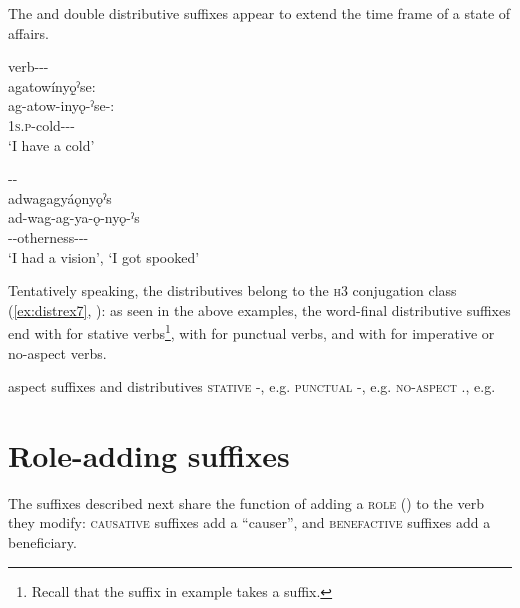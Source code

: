 The  and  double distributive suffixes appear to extend the time frame of a state of affairs.

\ea\label{ex:innerpl2}  verb-{\distributive}-{\distributive}-{\stative}\\
agatowínyǫ̱ˀse:\\
\gll ag-atow-inyǫ-ˀse-:\\
 \textsc{1s.p}-cold-{\distributive}-{\distributive}-{\stative}\\
\glt `I have a cold'
\z


\ea\label{ex:innerpl3}  {\distributive}-{\distributive}-{\plural}\\
adwagagyáǫnyǫˀs \\
\gll ad-wag-ag-ya-ǫ-nyǫ-ˀs\\
 {\factualdualic}-{\semireflexive}-otherness-{\distributive}-{\distributive}-{\plural}\\
\glt ‘I had a vision’, `I got spooked'
\z


Tentatively speaking, the distributives belong to the \textsc{h3} conjugation class (\ref{ex:distrex7}, ): as seen in the above examples, the word-final distributive suffixes end with  for stative verbs\footnote{Recall that the  {\distributive} suffix in example  takes a \stem{-:} {\stative} suffix.}, with  {\punctual} for punctual verbs, and with \stem{-:} \exsc{\noaspect} for imperative or no-aspect verbs. 

\ea\label{ex:distrex7} aspect suffixes and distributives
\ea \textsc{stative}  {\distributive}-{\stative}, e.g. 
\ex \textsc{punctual}  {\distributive}-{\punctual}, e.g. 
\ex \textsc{no-aspect}  {\distributive}.{\noaspect}, e.g. 
\z
\z






\section{Role-adding suffixes} \label{Role-adding suffixes}
The suffixes described next share the function of adding a \textsc{role} () to the verb they modify: \textsc{causative} suffixes add a “causer”, and \textsc{benefactive} suffixes add a beneficiary.


